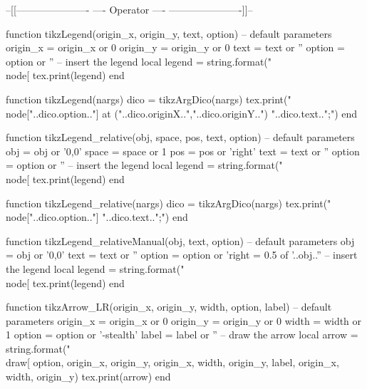 \usepackage[backend=biber, bibstyle=numeric, sorting=none]{biblatex}
\usepackage{tikz}
\usetikzlibrary{math}
\usetikzlibrary{calc}
\usetikzlibrary{fit}
\usetikzlibrary{positioning} %
\usetikzlibrary{decorations.pathreplacing}
\usetikzlibrary{decorations.shapes}
\usetikzlibrary{shapes.geometric}
\usetikzlibrary{arrows}
\usepackage{luacode}

\begin{luacode*}

	--[[----------------------
	----     Operator     ----
	----------------------]]--
  
	function tikzLegend(origin_x, origin_y, text, option)
	  -- default parameters
	  origin_x = origin_x or 0
	  origin_y = origin_y or 0
	  text = text or ''
	  option = option or ''
	  -- insert the legend
	  local legend = string.format("\\node[%
	  tex.print(legend)
	end

	function tikzLegend(nargs)
		dico = tikzArgDico(nargs)
		tex.print("\\node["..dico.option.."] at ("..dico.originX..","..dico.originY..") {"..dico.text.."};")
	end
  
	function tikzLegend_relative(obj, space, pos, text, option)
	  -- default parameters
	  obj = obj or '0,0'
	  space = space or 1
	  pos = pos or 'right'
	  text = text or ''
	  option = option or ''
	  -- insert the legend
	  local legend = string.format("\\node[%
	  tex.print(legend)
	end

	function tikzLegend_relative(nargs)
		dico = tikzArgDico(nargs)
		tex.print("\\node["..dico.option.."] {"..dico.text.."};")
	end
  
	function tikzLegend_relativeManual(obj, text, option)
	  -- default parameters
	  obj = obj or '0,0'
	  text = text or ''
	  option = option or 'right = 0.5 of '..obj..''
	  -- insert the legend
	  local legend = string.format("\\node[%
	  tex.print(legend)
	end
  
  
	function tikzArrow_LR(origin_x, origin_y, width, option, label)
	-- default parameters
	  origin_x = origin_x or 0
	  origin_y = origin_y or 0
	  width = width or 1
	  option = option or '-stealth'
	  label = label or ''
	  -- draw the arrow
	  local arrow = string.format("\\draw[%
	  option, origin_x, origin_y, origin_x, width, origin_y, label, origin_x, width, origin_y)
	  tex.print(arrow)
	end


\end{luacode*}
